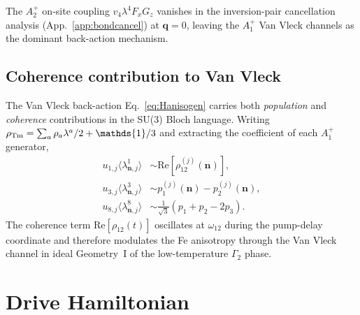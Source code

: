 \documentclass[reprint,amsmath,amssymb,aps,prb,longbibliography]{revtex4-2}
\begin{document}
The $A_2^+$ on-site coupling $v_4 \lambda^4 F_x G_z$ vanishes in the
inversion-pair cancellation analysis (App.~\ref{app:bondcancel}) at
$\mathbf q=0$, leaving the $A_1^+$ Van Vleck channels as the dominant
back-action mechanism.

\subsection{Coherence contribution to Van Vleck}
The Van Vleck back-action Eq.~\eqref{eq:Hanisogen} carries both
\emph{population} and \emph{coherence} contributions in the SU(3) Bloch
language. Writing $\rho_{\rm Tm} = \sum_a \rho_a\lambda^a/2 + \mathds{1}/3$ and
extracting the coefficient of each $A_1^+$ generator,
\begin{equation}
\begin{aligned}
u_{1,j}\langle\lambda^1_{\mathbf n,j}\rangle &\sim \mathrm{Re}[\rho^{(j)}_{12}(\mathbf n)],\\
u_{3,j}\langle\lambda^3_{\mathbf n,j}\rangle &\sim p_1^{(j)}(\mathbf n)-p_2^{(j)}(\mathbf n),\\
u_{8,j}\langle\lambda^8_{\mathbf n,j}\rangle &\sim \tfrac{1}{\sqrt 3}(p_1+p_2-2 p_3).
\end{aligned}
\label{eq:VVcoherence}
\end{equation}
The coherence term $\mathrm{Re}[\rho_{12}(t)]$ oscillates at $\omega_{12}$
during the pump-delay coordinate and therefore modulates the Fe
anisotropy through the Van Vleck channel in ideal Geometry~I of the
low-temperature $\Gamma_2$ phase.

\section{Drive Hamiltonian}
\label{sec:drive}
\end{document}
